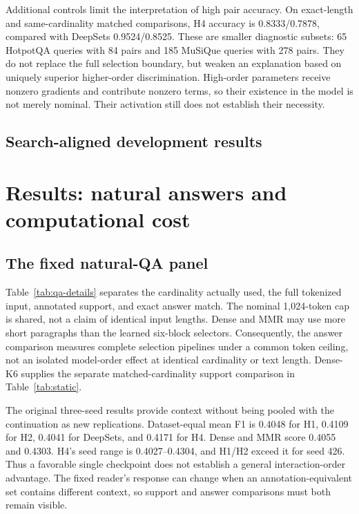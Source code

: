 \documentclass[pdflatex,sn-mathphys-num]{sn-jnl}
\begin{document}
Additional controls limit the interpretation of high pair accuracy.
On exact-length and same-cardinality matched comparisons, H4 accuracy is
0.8333/0.7878, compared with DeepSets 0.9524/0.8525. These are smaller
diagnostic subsets: 65 HotpotQA queries with 84 pairs and 185 MuSiQue queries
with 278 pairs. They do not replace the full selection boundary, but weaken
an explanation based on uniquely superior higher-order discrimination.
High-order parameters receive nonzero gradients and contribute nonzero
terms, so their existence in the model is not merely nominal. Their
activation still does not establish their necessity.

\subsection{Search-aligned development results}


\section{Results: natural answers and computational cost}\label{sec:answers}
\subsection{The fixed natural-QA panel}





Table~\ref{tab:qa-details} separates the cardinality actually used, the full
tokenized input, annotated support, and exact answer match. The nominal
1,024-token cap is shared, not a claim of identical input lengths. Dense and
MMR may use more short paragraphs than the learned six-block selectors.
Consequently, the answer comparison measures complete selection pipelines
under a common token ceiling, not an isolated model-order effect at identical
cardinality or text length. Dense-K6 supplies the separate matched-cardinality
support comparison in Table~\ref{tab:static}.

The original three-seed results provide context without being pooled with
the continuation as new replications. Dataset-equal mean F1 is 0.4048 for
H1, 0.4109 for H2, 0.4041 for DeepSets, and 0.4171 for H4. Dense and MMR
score 0.4055 and 0.4303. H4's seed range is 0.4027--0.4304, and H1/H2 exceed
it for seed 426. Thus a favorable single checkpoint does not establish a
general interaction-order advantage. The fixed reader's response can
change when an annotation-equivalent set contains different context, so
support and answer comparisons must both remain visible.
\end{document}
